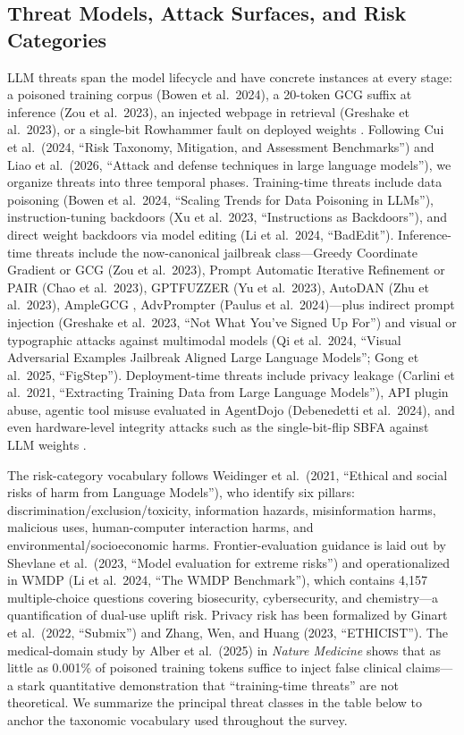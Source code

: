 \documentclass{article}
\begin{document}
\subsection{Threat Models, Attack Surfaces, and Risk Categories}\label{threat-models-attack-surfaces-and-risk-categories}

LLM threats span the model lifecycle and have concrete instances at every stage: a poisoned training corpus (Bowen et al.~2024), a 20-token GCG suffix at inference (Zou et al.~2023), an injected webpage in retrieval (Greshake et al.~2023), or a single-bit Rowhammer fault on deployed weights \citep{guo2025arxiv2509218432025}. Following Cui et al.~(2024, ``Risk Taxonomy, Mitigation, and Assessment Benchmarks'') and Liao et al.~(2026, ``Attack and defense techniques in large language models''), we organize threats into three temporal phases. Training-time threats include data poisoning (Bowen et al.~2024, ``Scaling Trends for Data Poisoning in LLMs''), instruction-tuning backdoors (Xu et al.~2023, ``Instructions as Backdoors''), and direct weight backdoors via model editing (Li et al.~2024, ``BadEdit''). Inference-time threats include the now-canonical jailbreak class---Greedy Coordinate Gradient or GCG (Zou et al.~2023), Prompt Automatic Iterative Refinement or PAIR (Chao et al.~2023), GPTFUZZER (Yu et al.~2023), AutoDAN (Zhu et al.~2023), AmpleGCG \citep{liao2024arxiv2404079212024}, AdvPrompter (Paulus et al.~2024)---plus indirect prompt injection (Greshake et al.~2023, ``Not What You've Signed Up For'') and visual or typographic attacks against multimodal models (Qi et al.~2024, ``Visual Adversarial Examples Jailbreak Aligned Large Language Models''; Gong et al.~2025, ``FigStep''). Deployment-time threats include privacy leakage (Carlini et al.~2021, ``Extracting Training Data from Large Language Models''), API plugin abuse, agentic tool misuse evaluated in AgentDojo (Debenedetti et al.~2024), and even hardware-level integrity attacks such as the single-bit-flip SBFA against LLM weights \citep{guo2025arxiv2509218432025}.

The risk-category vocabulary follows Weidinger et al.~(2021, ``Ethical and social risks of harm from Language Models''), who identify six pillars: discrimination/exclusion/toxicity, information hazards, misinformation harms, malicious uses, human-computer interaction harms, and environmental/socioeconomic harms. Frontier-evaluation guidance is laid out by Shevlane et al.~(2023, ``Model evaluation for extreme risks'') and operationalized in WMDP (Li et al.~2024, ``The WMDP Benchmark''), which contains 4,157 multiple-choice questions covering biosecurity, cybersecurity, and chemistry---a quantification of dual-use uplift risk. Privacy risk has been formalized by Ginart et al.~(2022, ``Submix'') and Zhang, Wen, and Huang (2023, ``ETHICIST''). The medical-domain study by Alber et al.~(2025) in \emph{Nature Medicine} shows that as little as 0.001\% of poisoned training tokens suffice to inject false clinical claims---a stark quantitative demonstration that ``training-time threats'' are not theoretical. We summarize the principal threat classes in the table below to anchor the taxonomic vocabulary used throughout the survey.
\end{document}

